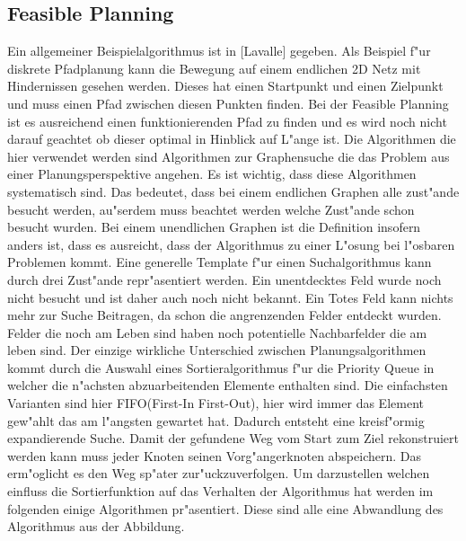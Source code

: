 
\subsection {Feasible Planning} %
Ein allgemeiner Beispielalgorithmus ist in [Lavalle] gegeben. Als Beispiel f"ur diskrete Pfadplanung kann die Bewegung auf einem endlichen 2D Netz mit Hindernissen gesehen werden. 
Dieses hat einen Startpunkt und einen Zielpunkt und muss einen Pfad zwischen diesen Punkten finden. Bei der Feasible Planning ist es ausreichend einen funktionierenden Pfad zu finden und es wird noch nicht darauf geachtet ob dieser optimal in Hinblick auf L"ange ist.
\newline
Die Algorithmen die hier verwendet werden sind Algorithmen zur Graphensuche die das Problem aus einer Planungsperspektive angehen. Es ist wichtig, dass diese Algorithmen systematisch sind. Das bedeutet, dass bei einem endlichen Graphen alle zust"ande besucht werden, au"serdem muss beachtet werden welche Zust"ande schon besucht wurden. Bei einem unendlichen Graphen ist die Definition insofern anders ist, dass es ausreicht, dass der Algorithmus zu einer L"osung bei l"osbaren Problemen kommt. 
\newline 
Eine generelle Template f"ur einen Suchalgorithmus kann durch drei Zust"ande repr"asentiert werden. 
Ein unentdecktes Feld wurde noch nicht besucht und ist daher auch noch nicht bekannt. Ein Totes Feld kann nichts mehr zur Suche Beitragen, da schon die angrenzenden Felder entdeckt wurden. Felder die noch am Leben sind haben noch potentielle Nachbarfelder die am leben sind.  
\newline
Der einzige wirkliche Unterschied zwischen Planungsalgorithmen kommt durch die Auswahl eines Sortieralgorithmus f"ur die Priority Queue in welcher die n"achsten abzuarbeitenden Elemente enthalten sind. Die einfachsten Varianten sind hier FIFO(First-In First-Out), hier wird immer das Element gew"ahlt das am l"angsten gewartet hat. Dadurch entsteht eine kreisf"ormig expandierende Suche. 
\newline
Damit der gefundene Weg vom Start zum Ziel rekonstruiert werden kann muss jeder Knoten seinen Vorg"angerknoten abspeichern. Das erm"oglicht es den Weg sp"ater zur"uckzuverfolgen. 
\newline
Um darzustellen welchen einfluss die Sortierfunktion auf das Verhalten der Algorithmus hat werden im folgenden einige Algorithmen pr"asentiert.
Diese sind alle eine Abwandlung des Algorithmus aus der Abbildung. 
\newline
\newline
